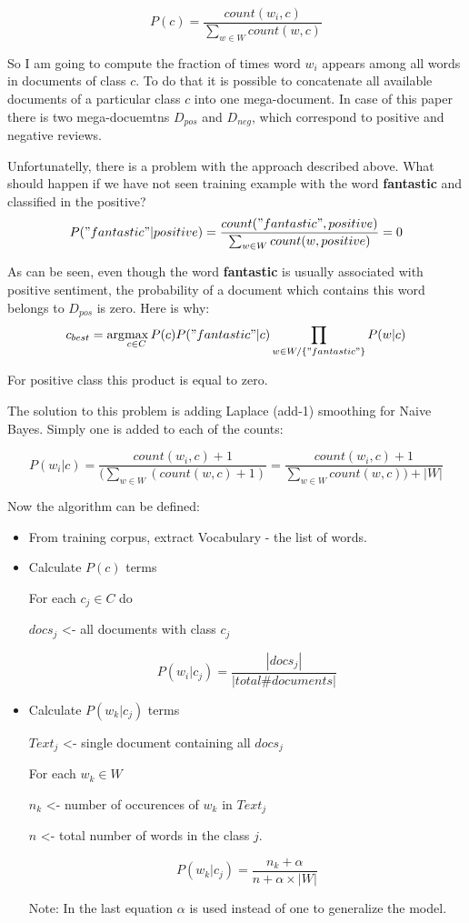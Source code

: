 \documentclass[12pt]{report}
\begin{document}
$$P(c) = \dfrac{count(w_i, c)}{\sum_{w \in W} {count(w, c)}}$$

So I am going to compute the fraction of times word $w_i$ appears among all words in documents of class $c$. To do that it is possible to concatenate all available documents of a particular class $c$ into one mega-document. In case of this paper there is two mega-docuemtns $D_{pos}$ and $D_{neg}$, which correspond to positive and negative reviews.

Unfortunatelly, there is a problem with the approach described above. What should happen if we have not seen training example with the word \textbf{fantastic} and classified in the positive?
$$P("fantastic" | positive) = \dfrac{count("fantastic", positive)}{\sum_{w \in W} {count(w, positive)}} = 0$$

As can be seen, even though the word \textbf{fantastic} is usually associated with positive sentiment, the probability of a document which contains this word belongs to $D_{pos}$ is zero. Here is why:
$$c_{best} = \arg\!\max_{c \in C} P(c) P("fantastic" | c) \prod_{w \in W/\{"fantastic"\}} {P(w | c) }$$

For positive class this product is equal to zero.

The solution to this problem is adding Laplace (add-1) smoothing for Naive Bayes. Simply one is added to each of the counts:

$$P(w_i | c) = \dfrac{count(w_i, c) + 1}{(\sum_{w \in W} {(count(w, c) + 1)}} = \dfrac{count(w_i, c) + 1}{\sum_{w \in W} {count(w, c)}) + |W|}$$


Now the algorithm can be defined:

\begin{itemize}
  \item From training corpus, extract Vocabulary - the list of words.
  \item Calculate $P(c)$ terms
    
   For each $c_j \in C$ do
  
      $docs_j$ <- all documents with class $c_j$ 

$$P(w_i | c_j) = \dfrac{|docs_j|}{|total \# documents|}$$

  \item Calculate $P(w_k | c_j)$ terms

$Text_j$ <- single document containing all $docs_j$

For each $w_k \in W$

$n_k$ <- number of occurences of $w_k$ in $Text_j$

$n$ <- total number of words in the class $j$.

$$P(w_k | c_j) = \dfrac{n_k + \alpha}{n + \alpha \times |W|}$$

Note: In the last equation $\alpha$ is used instead of one to generalize the model.
\end{itemize}
\end{document}
